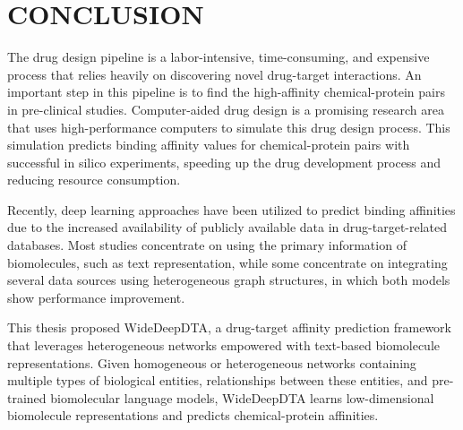 \chapter{CONCLUSION}
\label{chapter:concluion}

The drug design pipeline is a labor-intensive, time-consuming, and expensive process that relies heavily on discovering novel drug-target interactions. An important step in this pipeline is to find the high-affinity chemical-protein pairs in pre-clinical studies. Computer-aided drug design is a promising research area that uses high-performance computers to simulate this drug design process. This simulation predicts binding affinity values for chemical-protein pairs with successful in silico experiments, speeding up the drug development process and reducing resource consumption. 

Recently, deep learning approaches have been utilized to predict binding affinities due to the increased availability of publicly available data in drug-target-related databases. Most studies concentrate on using the primary information of biomolecules, such as text representation, while some concentrate on integrating several data sources using heterogeneous graph structures, in which both models show performance improvement. 



%
This thesis proposed WideDeepDTA, a drug-target affinity prediction framework that leverages heterogeneous networks empowered with text-based biomolecule representations. Given homogeneous or heterogeneous networks containing multiple types of biological entities, relationships between these entities, and pre-trained biomolecular language models, WideDeepDTA learns low-dimensional biomolecule representations and predicts chemical-protein affinities.


